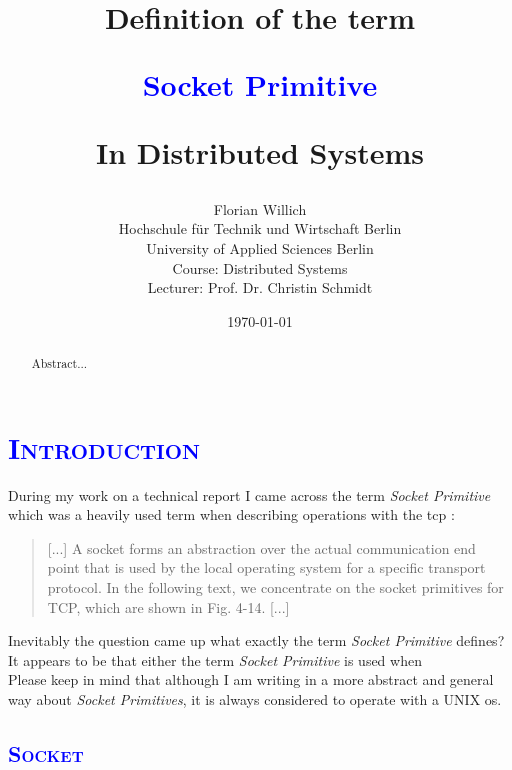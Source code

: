 \documentclass[xcolor=dvipsnames]{article}
\title{\scshape{
\begin{small}
Definition of the term\\
\end{small} 
\textbf{\textcolor{blue}{Socket Primitive}}\\
\begin{small}
In Distributed Systems
\end{small}
}}
\author{Florian Willich \\ Hochschule f\"ur Technik und Wirtschaft Berlin \\ University of Applied Sciences Berlin \\ Course: Distributed Systems \\ Lecturer: Prof. Dr. Christin Schmidt}
\date{\today}
\begin{document}

\begin{titlepage}

\maketitle

\begin{abstract}
Abstract...
\end{abstract}

\end{titlepage}

\newpage

\tableofcontents

\newpage


\section{\scshape{\textcolor{blue}{Introduction}}} \label{introduction}

During my work on a technical report I came across the term \textit{Socket Primitive} which was a heavily used term when describing operations with the \gls{tcp} \cite[p. 141, ch. 4.3.1]{tanenbaum}:

\begin{quote}
[...] A socket forms an abstraction over the actual communication end
point that is used by the local operating system for a specific
transport protocol. In the following text, we concentrate on the socket
primitives for TCP, which are shown in Fig. 4-14. [...] 
\end{quote}

\noindent Inevitably the question came up what exactly the term \textit{Socket Primitive} defines?\\

\noindent It appears to be that either the term \textit{Socket Primitive} is used when\\

\noindent Please keep in mind that although I am writing in a more abstract and general way about \textit{Socket Primitives}, it is always considered to operate with a UNIX \gls{os}.

\subsection{\scshape{\textcolor{blue}{Socket}}}
\end{document}
